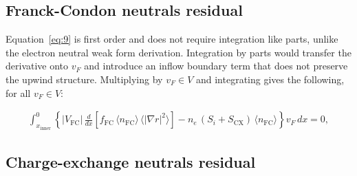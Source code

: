 \documentclass[twocolumn,secnumarabic,amssymb, nobibnotes, aps, prd]{revtex4-2}
\begin{document}

\subsection{Franck-Condon neutrals residual}
\label{sec:nfc-weak}

Equation~\eqref{eq:9} is first order and does not require integration like parts, unlike the electron neutral weak form derivation.
Integration by parts would transfer the derivative onto $v_F$ and introduce an inflow boundary term that does not preserve the upwind structure.
Multiplying by $v_F \in V$ and integrating gives the following, for all $v_F \in V$:
\begin{widetext}
\begin{align}
  \int_{x_{\mathrm{inner}}}^{0}
    \left\{
      |V_{\mathrm{FC}}|\,\frac{d}{dx}\!\left[f_{\mathrm{FC}}\,\langle n_{\mathrm{FC}}\rangle\,\langle|\nabla r|^{2}\rangle\right]
      - n_e\,(S_i + S_{\mathrm{CX}})\,\langle n_{\mathrm{FC}}\rangle
    \right\} v_F \, dx = 0,
  \label{eq:weak-nfc}
\end{align}
\end{widetext}


\subsection{Charge-exchange neutrals residual}
\label{sec:ncx-weak}
\end{document}
